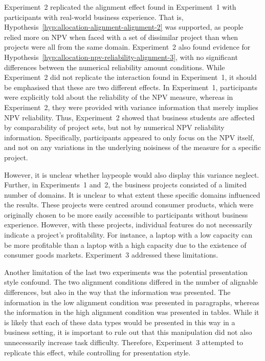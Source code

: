 \documentclass[a4paper, nobind, dvipsnames]{templates/ociamthesis}
\theoremstyle{definition}
\theoremstyle{definition}
\theoremstyle{definition}
\theoremstyle{definition}
\theoremstyle{remark}
\begin{document}
Experiment~2 replicated the alignment effect found in Experiment~1 with
participants with real-world business experience. That is,
Hypothesis~\ref{hyp:allocation-alignment-alignment-2} was supported, as people
relied more on NPV when faced with a set of dissimilar project than when
projects were all from the same domain. Experiment~2 also found evidence for
Hypothesis~\ref{hyp:allocation-npv-reliability-alignment-3}, with no
significant differences between the numerical reliability amount conditions.
While Experiment~2 did not replicate the interaction found in Experiment~1, it
should be emphasised that these are two different effects. In Experiment~1,
participants were explicitly told about the reliability of the NPV measure,
whereas in Experiment~2, they were provided with variance information that
merely implies NPV reliability. Thus, Experiment~2 showed that business students
are affected by comparability of project sets, but not by numerical NPV
reliability information. Specifically, participants appeared to only focus on
the NPV itself, and not on any variations in the underlying noisiness of the
measure for a specific project.

However, it is unclear whether laypeople would also display this variance
neglect. Further, in Experiments~1 and~2, the business projects consisted of a
limited number of domains. It is unclear to what extent these specific domains
influenced the results. These projects were centred around consumer products,
which were originally chosen to be more easily accessible to participants
without business experience. However, with these projects, individual features
do not necessarily indicate a project's profitability. For instance, a laptop
with a low capacity can be more profitable than a laptop with a high capacity
due to the existence of consumer goods markets. Experiment~3 addressed these
limitations.

Another limitation of the last two experiments was the potential presentation
style confound. The two alignment conditions differed in the number of alignable
differences, but also in the way that the information was presented. The
information in the low alignment condition was presented in paragraphs, whereas
the information in the high alignment condition was presented in tables. While
it is likely that each of these data types would be presented in this way in a
business setting, it is important to rule out that this manipulation did not
also unnecessarily increase task difficulty. Therefore, Experiment~3 attempted
to replicate this effect, while controlling for presentation style.
\end{document}
